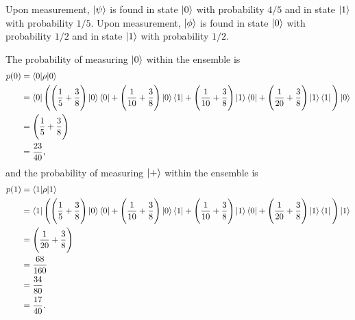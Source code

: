 \documentclass[10pt]{article}
\begin{document}
Upon measurement, $\ket{\psi}$ is found in state $\ket{0}$ with probability $4 / 5$ and in state $\ket{1}$ with probability $1/5$. Upon measurement, $\ket{\phi}$  is found in state $\ket{0}$ with probability $1 / 2$ and in state $\ket{1}$ with probability $1/2$. 

The probability of measuring $\ket{0}$ within the ensemble is
\begin{align*}
p(0) &= \braket{0|\rho|0} \\
       &= \bra{0} \Bigg( \Bigg( \frac{1}{5} + \frac{3}{8} \Bigg) \ket{0} \bra{0} + \Bigg( \frac{1}{10} + \frac{3}{8}\Bigg) \ket{0} \bra{1} + \Bigg( \frac{1}{10} + \frac{3}{8} \Bigg) \ket{1} \bra{0} + \Bigg( \frac{1}{20} + \frac{3}{8} \Bigg)\ket{1} \bra{1} \Bigg) \ket{0} \\
       &= \Bigg( \frac{1}{5} + \frac{3}{8} \Bigg) \\
       &= \frac{23}{40},
\end{align*}
and the probability of measuring $\ket{+}$ within the ensemble is
\begin{align*}
p(1) &= \braket{1|\rho|1} \\
       &= \bra{1} \Bigg( \Bigg( \frac{1}{5} + \frac{3}{8} \Bigg) \ket{0} \bra{0} + \Bigg( \frac{1}{10} + \frac{3}{8}\Bigg) \ket{0} \bra{1} + \Bigg( \frac{1}{10} + \frac{3}{8} \Bigg) \ket{1} \bra{0} + \Bigg( \frac{1}{20} + \frac{3}{8} \Bigg)\ket{1} \bra{1} \Bigg) \ket{1} \\
       &= \Bigg( \frac{1}{20} + \frac{3}{8} \Bigg) \\
       &= \frac{68}{160} \\
       &= \frac{34}{80} \\
       &= \frac{17}{40}.
\end{align*}
\end{document}
